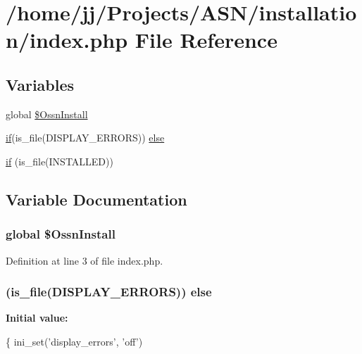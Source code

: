 \hypertarget{installation_2index_8php}{}\section{/home/jj/\+Projects/\+A\+S\+N/installation/index.php File Reference}
\label{installation_2index_8php}
\subsection*{Variables}
\begin{DoxyCompactItemize}
\item 
global \hyperlink{installation_2index_8php_ab641c6db77ce99b0906cabf64600095f}{\$\+Ossn\+Install}
\item 
\hyperlink{jquery_8tokeninput_8js_ad8dd46a3cbc004569e34401e9e71771a}{if}(is\+\_\+file(\textquotesingle{}D\+I\+S\+P\+L\+A\+Y\+\_\+\+E\+R\+R\+O\+RS\textquotesingle{})) \hyperlink{installation_2index_8php_a0824bddd328b7e1e1a478fa8d0518026}{else}
\item 
\hyperlink{installation_2index_8php_a8b40f235228230e7d34abc26ab95dedc}{if} (is\+\_\+file(\textquotesingle{}I\+N\+S\+T\+A\+L\+L\+ED\textquotesingle{}))
\end{DoxyCompactItemize}


\subsection{Variable Documentation}
\subsubsection[{\texorpdfstring{\$\+Ossn\+Install}{$OssnInstall}}]{\setlength{\rightskip}{0pt plus 5cm}global \$Ossn\+Install}\hypertarget{installation_2index_8php_ab641c6db77ce99b0906cabf64600095f}{}\label{installation_2index_8php_ab641c6db77ce99b0906cabf64600095f}


Definition at line 3 of file index.\+php.

\subsubsection[{\texorpdfstring{else}{else}}]{ (is\+\_\+file(\textquotesingle{}D\+I\+S\+P\+L\+A\+Y\+\_\+\+E\+R\+R\+O\+RS\textquotesingle{})) else}\hypertarget{installation_2index_8php_a0824bddd328b7e1e1a478fa8d0518026}{}\label{installation_2index_8php_a0824bddd328b7e1e1a478fa8d0518026}
{\bfseries Initial value\+:}
\begin{DoxyCode}
\{
    ini\_set(\textcolor{stringliteral}{'display\_errors'}, \textcolor{stringliteral}{'off'})
\end{DoxyCode}


